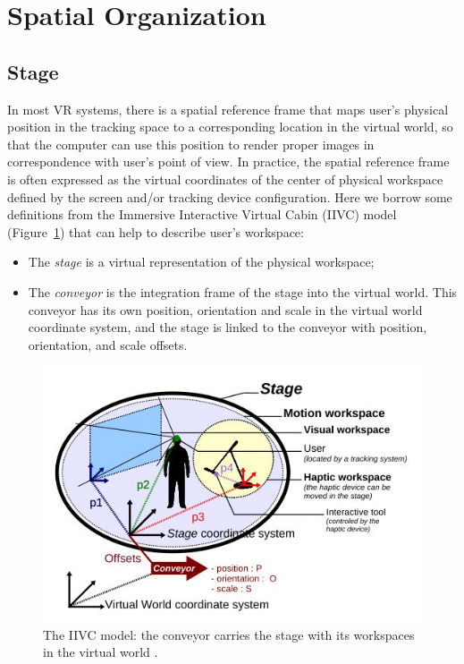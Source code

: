 

\section{Spatial Organization} 

\subsection{Stage}
\label{sec:stage}
In most VR systems, there is a spatial reference frame that maps user's physical position in the tracking space to a corresponding location in the virtual world, so that the computer can use this position to render proper images in correspondence with user's point of view. In practice, the spatial reference frame is often expressed as the virtual coordinates of the center of physical workspace defined by the screen and/or tracking device configuration. Here we borrow some definitions from the Immersive Interactive Virtual Cabin (IIVC) model (Figure~\ref{fig:2_iivc}) that can help to describe user's workspace:

\begin{itemize}
\item The \textit{stage} is a virtual representation of the physical workspace;
\item The \textit{conveyor} is the integration frame of the stage into the virtual world. This conveyor has its own position, orientation and scale in the virtual world coordinate system, and the stage is linked to the conveyor with position, orientation, and scale offsets.
\end{itemize}

\begin{figure}[htb]
  \centering
  \includegraphics[width=.7\textwidth]{figures/ch2/IIVC}
  \caption{\label{fig:2_iivc}The IIVC model: the conveyor carries the stage with its workspaces in the virtual world \citep{Fleury2010Generic}.}
\end{figure}

